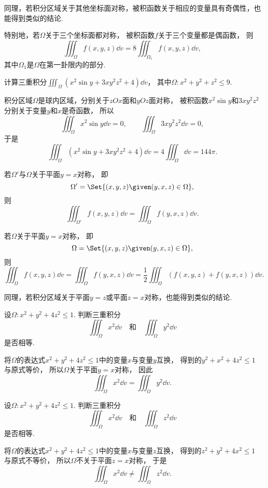 同理，若积分区域关于其他坐标面对称，被积函数关于相应的变量具有奇偶性，也能得到类似的结论.

特别地，若\(\Omega\)关于三个坐标面都对称，
被积函数\(f\)关于三个变量都是偶函数，
则\[
	\iiint_\Omega f(x,y,z) \dd{v}
	= 8 \iiint_{\Omega_1} f(x,y,z) \dd{v},
\]
其中\(\Omega_1\)是\(\Omega\)在第一卦限内的部分.

\begin{example}
计算三重积分\(\iiint_\Omega (x^2 \sin y + 3xy^2z^2 + 4) \dd{v}\)，
其中\(\Omega: x^2+y^2+z^2\leq9\).
\begin{solution}
积分区域\(\Omega\)是球内区域，分别关于\(zOx\)面和\(yOz\)面对称，
被积函数\(x^2 \sin y\)和\(3xy^2z^2\)分别关于变量\(y\)和\(x\)是奇函数，
所以\[
	\iiint_\Omega x^2 \sin y \dd{v} = 0,
	\qquad
	\iiint_\Omega 3xy^2z^2 \dd{v} = 0,
\]
于是\[
	\iiint_\Omega (x^2 \sin y + 3xy^2z^2 + 4) \dd{v}
	= 4 \iiint_\Omega \dd{v}
	= 144 \pi.
\]
\end{solution}
\end{example}

若\(\Omega'\)与\(\Omega\)关于平面\(y=x\)对称，
即\[
	\Omega' = \Set{ (x,y,z) \given (y,x,z) \in \Omega },
\]
则\[
	\iiint_{\Omega'} f(x,y,z) \dd{v}
	= \iiint_\Omega f(y,x,z) \dd{v}.
\]

若\(\Omega\)关于平面\(y=x\)对称，
即\[
	\Omega = \Set{ (x,y,z) \given (y,x,z) \in \Omega },
\]
则\[
	\iiint_\Omega f(x,y,z) \dd{v}
	= \iiint_\Omega f(y,x,z) \dd{v}
	= \frac12 \iiint_\Omega (f(x,y,z) + f(y,x,z)) \dd{v}.
\]

同理，若积分区域关于平面\(y=z\)或平面\(z=x\)对称，也能得到类似的结论.

\begin{example}
设\(\Omega: x^2+y^2+4z^2\leq1\).
判断三重积分\[
	\iiint_\Omega x^2 \dd{v}
	\quad\text{和}\quad
	\iiint_\Omega y^2 \dd{v}
\]是否相等.
\begin{solution}
将\(\Omega\)的表达式\(x^2+y^2+4z^2\leq1\)中的变量\(x\)与变量\(y\)互换，
得到的\(y^2+x^2+4z^2\leq1\)与原式等价，
所以\(\Omega\)关于平面\(y=x\)对称，
因此\[
	\iiint_\Omega x^2 \dd{v}
	= \iiint_\Omega y^2 \dd{v}.
\]
\end{solution}
\end{example}

\begin{example}
设\(\Omega: x^2+y^2+4z^2\leq1\).
判断三重积分\[
	\iiint_\Omega x^2 \dd{v}
	\quad\text{和}\quad
	\iiint_\Omega z^2 \dd{v}
\]是否相等.
\begin{solution}
将\(\Omega\)的表达式\(x^2+y^2+4z^2\leq1\)中的变量\(x\)与变量\(z\)互换，
得到的\(z^2+y^2+4x^2\leq1\)与原式不等价，
所以\(\Omega\)不关于平面\(z=x\)对称，
于是\[
	\iiint_\Omega x^2 \dd{v}
	\neq \iiint_\Omega z^2 \dd{v}.
\]
\end{solution}
\end{example}
